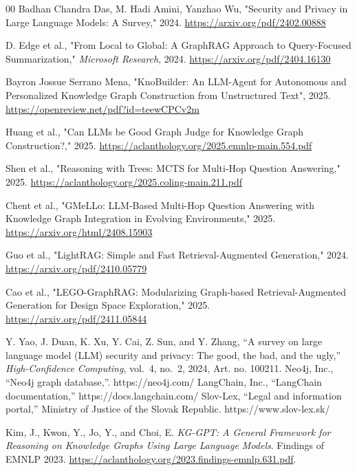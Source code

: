 \documentclass[conference]{IEEEtran}
\begin{document}
\begin{thebibliography}{00}
Badhan Chandra Das, M. Hadi Amini, Yanzhao Wu, "Security and Privacy in Large Language Models: A Survey," 2024.
\url{https://arxiv.org/pdf/2402.00888}

D. Edge et al., "From Local to Global: A GraphRAG Approach to Query-Focused Summarization," \textit{Microsoft Research}, 2024.
\url{https://arxiv.org/pdf/2404.16130}

Bayron Jossue Serrano Mena, "KnoBuilder: An LLM-Agent for Autonomous and Personalized Knowledge Graph Construction from Unstructured Text", 2025. \url{https://openreview.net/pdf?id=teewCPCv2m}

Huang et al., "Can LLMs be Good Graph Judge for Knowledge Graph Construction?," 2025. \url{https://aclanthology.org/2025.emnlp-main.554.pdf}

Shen et al., "Reasoning with Trees: MCTS for Multi-Hop Question Answering," 2025. \url{https://aclanthology.org/2025.coling-main.211.pdf}

Chent et al., "GMeLLo: LLM-Based Multi-Hop Question Answering with Knowledge Graph Integration in Evolving Environments," 2025. \url{https://arxiv.org/html/2408.15903}

Guo et al., "LightRAG: Simple and Fast Retrieval-Augmented Generation," 2024. \url{https://arxiv.org/pdf/2410.05779}

Cao et al., "LEGO-GraphRAG: Modularizing Graph-based Retrieval-Augmented Generation for Design Space Exploration," 2025. \url{https://arxiv.org/pdf/2411.05844}


 Y. Yao, J. Duan, K. Xu, Y. Cai, Z. Sun, and Y. Zhang, ``A survey on large language model (LLM) security and privacy: The good, the bad, and the ugly,'' \textit{High-Confidence Computing}, vol.~4, no.~2, 2024, Art. no. 100211.
 Neo4j, Inc., ``Neo4j graph database,''. https://neo4j.com/
 LangChain, Inc., ``LangChain documentation,'' https://docs.langchain.com/
 Slov-Lex, ``Legal and information portal,'' Ministry of Justice of the Slovak Republic. https://www.slov-lex.sk/

Kim, J., Kwon, Y., Jo, Y., and Choi, E.
\newblock \emph{KG-GPT: A General Framework for Reasoning on Knowledge Graphs
Using Large Language Models}.
\newblock Findings of EMNLP 2023.
\newblock \url{https://aclanthology.org/2023.findings-emnlp.631.pdf}.


\end{thebibliography}
\end{document}
